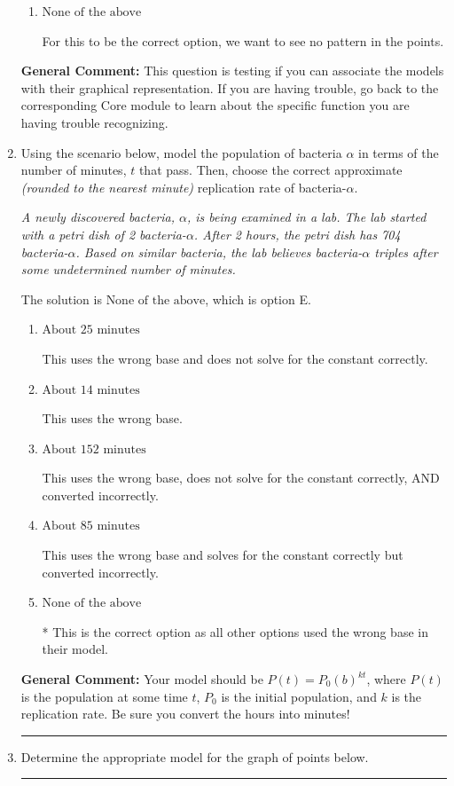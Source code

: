 \documentclass{extbook}[14pt]
\newcommand{\litem}[1]{\item #1

\rule{\textwidth}{0.4pt}}
\begin{document}
\begin{enumerate}
{\begin{enumerate}[label=\Alph*.]
For this to be the correct option, we need to see a polynomial or rational shape.
\item \( \text{None of the above} \)

For this to be the correct option, we want to see no pattern in the points.
\end{enumerate}

\textbf{General Comment:} This question is testing if you can associate the models with their graphical representation. If you are having trouble, go back to the corresponding Core module to learn about the specific function you are having trouble recognizing.
}
\litem{
Using the scenario below, model the population of bacteria $\alpha$ in terms of the number of minutes, $t$ that pass. Then, choose the correct approximate \textit{(rounded to the nearest minute)} replication rate of bacteria-$\alpha$.

\begin{center}
    \textit{ A newly discovered bacteria, $\alpha$, is being examined in a lab. The lab started with a petri dish of 2 bacteria-$\alpha$. After 2 hours, the petri dish has 704 bacteria-$\alpha$. Based on similar bacteria, the lab believes bacteria-$\alpha$ triples after some undetermined number of minutes. }
\end{center}
The solution is \( \text{None of the above} \), which is option E.\begin{enumerate}[label=\Alph*.]
\item \( \text{About } 25 \text{ minutes} \)

This uses the wrong base and does not solve for the constant correctly.
\item \( \text{About } 14 \text{ minutes} \)

This uses the wrong base.
\item \( \text{About } 152 \text{ minutes} \)

This uses the wrong base, does not solve for the constant correctly, AND converted incorrectly.
\item \( \text{About } 85 \text{ minutes} \)

This uses the wrong base and solves for the constant correctly but converted incorrectly.
\item \( \text{None of the above} \)

* This is the correct option as all other options used the wrong base in their model.
\end{enumerate}

\textbf{General Comment:} Your model should be $P(t) = P_0(b)^{kt}$, where $P(t)$ is the population at some time $t$, $P_0$ is the initial population, and $k$ is the replication rate. Be sure you convert the hours into minutes!
}
\litem{
Determine the appropriate model for the graph of points below.

}
\end{enumerate}
\end{document}
